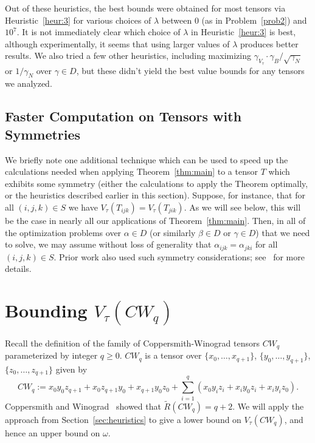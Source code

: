\documentclass{theoretics}
\begin{document}
Out of these heuristics, the best bounds were obtained for most tensors via Heuristic~\ref{heur:3} for various choices of $\lambda$ between $0$ (as in Problem~\ref{prob2}) and $10^7$. It is not immediately clear which choice of $\lambda$ in Heuristic~\ref{heur:3} is best, although experimentally, it seems that using larger values of $\lambda$ produces better results. We also tried a few other heuristics, including maximizing $\gamma_{V_\tau} \cdot \gamma_B / \sqrt{\gamma_N}$ or $1/\gamma_N$ over $\gamma \in D$, but these didn't yield the best value bounds for any tensors we analyzed.

\subsection{Faster Computation on Tensors with Symmetries}

We briefly note one additional technique which can be used to speed up the calculations needed when applying Theorem~\ref{thm:main} to a tensor $T$ which exhibits some symmetry (either the calculations to apply the Theorem optimally, or the heuristics described earlier in this section).  Suppose, for instance, that for all $(i,j,k) \in S$ we have $V_\tau(T_{ijk}) = V_\tau(T_{jik})$. As we will see below, this will be the case in nearly all our applications of Theorem~\ref{thm:main}. Then, in all of the optimization problems over $\alpha \in D$ (or similarly $\beta \in D$ or $\gamma \in D$) that we need to solve, we may assume without loss of generality that $\alpha_{ijk} = \alpha_{jki}$ for all $(i,j,k) \in S$. Prior work also used such symmetry considerations; see~\cite{stothers,v12,legall} for more details.


\section{Bounding \texorpdfstring{$V_\tau(CW_q)$}{V(CWq)}} \label{sec:final-answer}
Recall the definition of the family of Coppersmith-Winograd tensors $CW_q$ parameterized by integer $q\geq 0$. $CW_q$ is a tensor over $\{x_0,\ldots,x_{q+1}\}$, $\{y_0, \ldots, y_{q+1}\}$, $\{z_0, \ldots, z_{q+1}\}$ given by $$CW_q := x_0 y_0 z_{q+1} + x_0 z_{q+1} y_0 + x_{q+1} y_0 z_0 + \sum_{i=1}^q (x_0 y_i z_i + x_i y_0 z_i + x_i y_i z_0).$$ 
Coppersmith and Winograd~\cite{coppersmith} showed that $\tilde{R}(CW_q) = q+2$. We will apply the approach from Section~\ref{sec:heuristics} to give a lower bound on $V_\tau(CW_q)$, and hence an upper bound on $\omega$.
\end{document}

